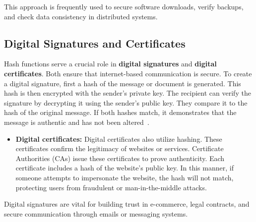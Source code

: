 \documentclass[11pt,a4paper]{article}
\begin{document}
        This approach is frequently used to secure software downloads, verify backups, and check data consistency in distributed systems.

    \subsection*{Digital Signatures and Certificates}
    Hash functions serve a crucial role in \textbf{digital signatures} and \textbf{digital certificates}. Both ensure that internet-based communication is secure. To create a digital signature, first a hash of the message or document is generated. This hash is then encrypted with the sender's private key. The recipient can verify the signature by decrypting it using the sender's public key. They compare it to the hash of the original message. If both hashes match, it demonstrates that the message is authentic and has not been altered~\cite{Digital-signatures}.
        \begin{itemize}
            \item \textbf{Digital certificates:} Digital certificates also utilize hashing. These certificates confirm the legitimacy of websites or services. Certificate Authorities (CAs) issue these certificates to prove authenticity. Each certificate includes a hash of the website's public key. In this manner, if someone attempts to impersonate the website, the hash will not match, protecting users from fraudulent or man-in-the-middle attacks.
        \end{itemize}
        Digital signatures are vital for building trust in e-commerce, legal contracts, and secure communication through emails or messaging systems.
\end{document}
